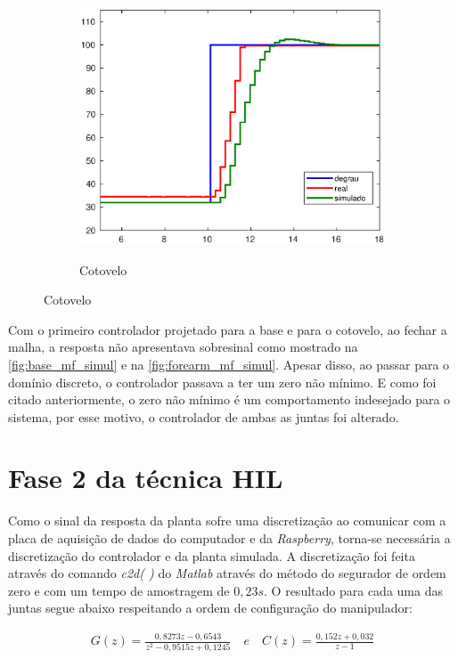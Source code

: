 \begin{figure}[h!]
\begin{subfigure}{.5\textwidth}
    \label{fig:shoulder_mf_simul}
  \end{subfigure}%
  \\[5ex]
  \begin{subfigure}{\textwidth}
    \centering
    \caption{Cotovelo}
    \includegraphics[width = 0.55\columnwidth]{Imagens/forearm_mf_simul}
    \label{fig:forearm_mf_simul}
  \end{subfigure}%
  
  \label{fig:ensaioMalhaAberta} 

\end{figure}

Com o primeiro controlador projetado para a base e para o cotovelo, ao fechar a malha, a resposta não apresentava
sobresinal como mostrado na \autoref{fig:base_mf_simul} e na \autoref{fig:forearm_mf_simul}. Apesar disso,
ao passar para o domínio discreto, o controlador passava a ter um zero não mínimo. E como foi citado 
anteriormente, o zero não mínimo é um comportamento indesejado para o sistema, por esse motivo, o controlador
de ambas as juntas foi alterado.

\section{Fase 2 da técnica HIL}

Como o sinal da resposta da planta sofre uma discretização ao comunicar com a placa de aquisição de dados do
computador e da \textit{Raspberry}, torna-se necessária a discretização do controlador e da planta simulada. A 
discretização foi feita através do comando \textit{c2d( )} do \textit{Matlab} através do método do segurador de 
ordem zero e com um tempo de amostragem de $0,23s$. O resultado para cada uma das juntas
segue abaixo respeitando a ordem de configuração do manipulador:

\begin{equation}
  \begin{gathered}
    G(z) = \frac{0,8273z - 0,6543}{z^2 - 0,9515z + 0,1245} \quad e \quad C(z) = \frac{0,152z + 0,032}{z - 1}
  \end{gathered}
  \label{eq:base_discrete}
\end{equation}

